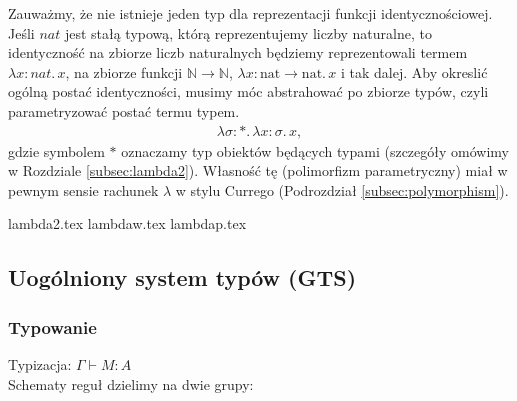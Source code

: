 \begin{przyklad}
  Zauważmy, że nie istnieje jeden typ dla reprezentacji funkcji identycznościowej. Jeśli \(nat\) jest stałą typową, którą reprezentujemy liczby naturalne, to identyczność na zbiorze liczb naturalnych będziemy reprezentowali termem \(\lambda x:nat.\,x\), na zbiorze funkcji \(\mathbb{N}\to\mathbb{N}\), \(\lambda x:\mathrm{nat}\to\mathrm{nat}.\,x\) i tak dalej.
  Aby okreslić ogólną postać identyczności, musimy móc abstrahować po zbiorze typów, czyli parametryzować postać termu typem. %
      \begin{align*}
        \lambda \sigma:* .\,\lambda x:\sigma.\,x,
      \end{align*}
      gdzie symbolem \(*\) oznaczamy typ obiektów będących typami (szczegóły omówimy w Rozdziale \ref{subsec:lambda2}).
      Własność tę (polimorfizm parametryczny) miał w pewnym sensie rachunek \(\lambda\) w stylu Currego (Podrozdział \ref{subsec:polymorphism}). 
\end{przyklad}

{lambda2.tex}
{lambdaw.tex}
{lambdap.tex}

\subsection{Uogólniony system typów (GTS)}
  \subsubsection{Typowanie}
  Typizacja: \(\Gamma \vdash M : A\)\\

  Schematy reguł dzielimy na dwie grupy:



